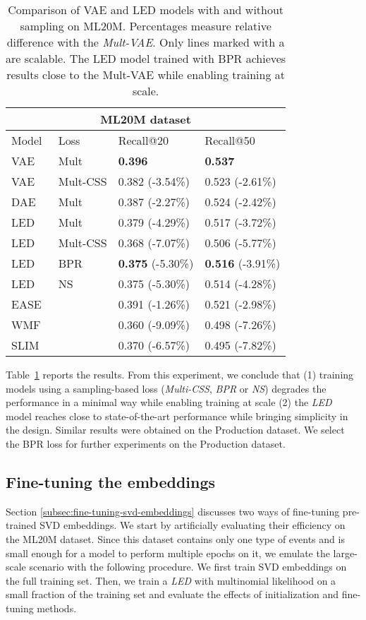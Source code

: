 \documentclass[sigconf]{acmart}
\begin{document}
\begin{table}[h]
\centering
\caption{Comparison of VAE and LED models with and without sampling on ML20M. Percentages measure relative difference with the \emph{Mult-VAE}. Only lines marked with a  are scalable. The LED model trained with BPR achieves results close to the Mult-VAE while enabling training at scale.}
\begin{tabularx}{.49\textwidth}{|X|X|l|l|}
  \hline
    \multicolumn{4}{|c|}{ML20M dataset} \\
  \hline
    Model & Loss & Recall@20 & Recall@50 \\
    \hline
  VAE~\cite{variational-liang-2018} & Mult & \textbf{0.396} & \textbf{0.537}   \\
  VAE & Mult-CSS  &  0.382 (-3.54\%) & 0.523 (-2.61\%) \\
  DAE~\cite{variational-liang-2018} & Mult & 0.387 (-2.27\%)  & 0.524 (-2.42\%) \\
  \hline
  LED & Mult & 0.379 (-4.29\%) & 0.517 (-3.72\%) \\
  LED & Mult-CSS  & 0.368 (-7.07\%) & 0.506 (-5.77\%) \\
  LED & BPR  & \textbf{0.375} (-5.30\%) & \textbf{0.516}  (-3.91\%) \\
  LED & NS  & 0.375 (-5.30\%) & 0.514  (-4.28\%) \\
  \hline
  EASE~\cite{ease-vae} & & 0.391 (-1.26\%) & 0.521  (-2.98\%) \\
  WMF~\cite{wmf} & & 0.360 (-9.09\%) & 0.498 (-7.26\%)\\
  SLIM~\cite{slim} & &0.370 (-6.57\%) & 0.495  (-7.82\%) \\
\hline
    \end{tabularx}
\label{table:results-sampling-loss-ml20m}
\end{table}

Table~\ref{table:results-sampling-loss-ml20m} reports the results. From this experiment, we conclude that (1) training models using a sampling-based loss (\emph{Multi-CSS}\cite{pmlr-v54-botev17a}, \emph{BPR}\cite{bpr} or \emph{NS}\cite{NIPS2013_5021}) degrades the performance in a minimal way while enabling training at scale (2) the \emph{LED} model reaches close to state-of-the-art performance while bringing simplicity in the design. Similar results were obtained on the Production dataset. We select the BPR loss for further experiments on the Production dataset.

\subsection{Fine-tuning the embeddings}
\label{sec:fine-tuning-results}
Section \ref{subsec:fine-tuning-svd-embeddings} discusses two ways of fine-tuning pre-trained SVD embeddings. We start by artificially evaluating their efficiency on the ML20M dataset. Since this dataset contains only one type of events and is small enough for a model to perform multiple epochs on it, we emulate the large-scale scenario with the following procedure. We first train SVD embeddings on the full training set. Then, we train a \emph{LED} with multinomial likelihood on a small fraction of the training set and evaluate the effects of initialization and fine-tuning methods.
\end{document}

